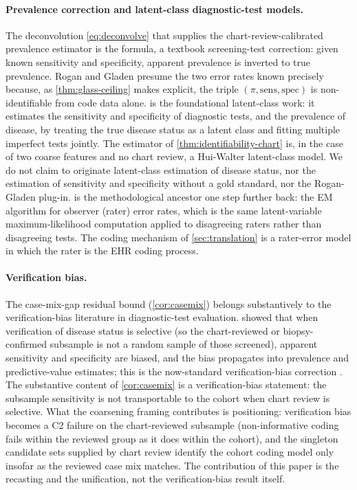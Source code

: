\paragraph{Prevalence correction and latent-class diagnostic-test
models.} The deconvolution \eqref{eq:deconvolve} that supplies the
chart-review-calibrated prevalence estimator is the
\citet{rogan1978estimating} formula, a textbook screening-test
correction: given known sensitivity and specificity, apparent
prevalence is inverted to true prevalence. Rogan and Gladen presume
the two error rates known precisely because, as \cref{thm:glass-ceiling}
makes explicit, the triple $(\pi, \mathrm{sens}, \mathrm{spec})$ is
non-identifiable from code data alone. \citet{hui1980estimating} is
the foundational latent-class work: it estimates the sensitivity and
specificity of diagnostic tests, and the prevalence of disease, by
treating the true disease status as a latent class and fitting
multiple imperfect tests jointly. The estimator of
\cref{thm:identifiability-chart} is, in the case of two coarse features
and no chart review, a Hui-Walter latent-class model. We do not claim
to originate latent-class estimation of disease status, nor the
estimation of sensitivity and specificity without a gold standard, nor
the Rogan-Gladen plug-in. \citet{dawid1979maximum} is the
methodological ancestor one step further back: the EM algorithm for
observer (rater) error rates, which is the same latent-variable
maximum-likelihood computation applied to disagreeing raters rather
than disagreeing tests. The coding mechanism of \cref{sec:translation}
is a rater-error model in which the rater is the EHR coding process.

\paragraph{Verification bias.} The case-mix-gap residual bound
(\cref{cor:casemix}) belongs substantively to the verification-bias
literature in diagnostic-test evaluation. \citet{begg1983assessment}
showed that when verification of disease status is selective (so the
chart-reviewed or biopsy-confirmed subsample is not a random sample of
those screened), apparent sensitivity and specificity are biased, and
the bias propagates into prevalence and predictive-value estimates;
this is the now-standard verification-bias correction
\citep{hubbard2020outcome}. The substantive content of
\cref{cor:casemix} is a verification-bias statement: the subsample
sensitivity is not transportable to the cohort when chart review is
selective. What the coarsening framing contributes is positioning:
verification bias becomes a C2 failure on the chart-reviewed subsample
(non-informative coding fails within the reviewed group as it does
within the cohort), and the singleton candidate sets supplied by chart
review identify the cohort coding model only insofar as the reviewed
case mix matches. The contribution of this paper is the recasting and
the unification, not the verification-bias result itself.

